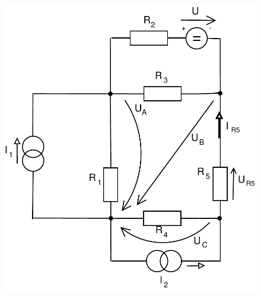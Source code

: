 \documentclass[12pt,a4paper]{article}
\begin{document}
  \begin{minipage}{\linewidth}
      \centering
      \begin{minipage}{0.45\linewidth}
          \begin{figure}[H]
              \includegraphics[width=\linewidth]{Circuits/3-A.pdf}
          \end{figure}
      \end{minipage}
      \hspace{0.05\linewidth}
      \begin{minipage}{0.45\linewidth}
          \begin{figure}[H]

\end{figure}
\end{minipage}
\end{minipage}
\end{document}
